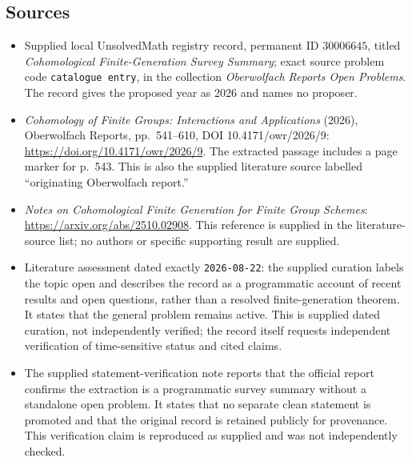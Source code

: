 \documentclass[11pt]{article}
\begin{document}
\subsection{Sources}
\begin{itemize}
\item Supplied local UnsolvedMath registry record, permanent ID \(30006645\), titled \emph{Cohomological Finite-Generation Survey Summary}; exact source problem code \texttt{catalogue entry}, in the collection \emph{Oberwolfach Reports Open Problems}. The record gives the proposed year as 2026 and names no proposer.
\item \emph{Cohomology of Finite Groups: Interactions and Applications} (2026), Oberwolfach Reports, pp.\ 541--610, DOI 10.4171/owr/2026/9: \url{https://doi.org/10.4171/owr/2026/9}. The extracted passage includes a page marker for p.\ 543. This is also the supplied literature source labelled ``originating Oberwolfach report.''
\item \emph{Notes on Cohomological Finite Generation for Finite Group Schemes}: \url{https://arxiv.org/abs/2510.02908}. This reference is supplied in the literature-source list; no authors or specific supporting result are supplied.
\item Literature assessment dated exactly \texttt{2026-08-22}: the supplied curation labels the topic open and describes the record as a programmatic account of recent results and open questions, rather than a resolved finite-generation theorem. It states that the general problem remains active. This is supplied dated curation, not independently verified; the record itself requests independent verification of time-sensitive status and cited claims.
\item The supplied statement-verification note reports that the official report confirms the extraction is a programmatic survey summary without a standalone open problem. It states that no separate clean statement is promoted and that the original record is retained publicly for provenance. This verification claim is reproduced as supplied and was not independently checked.
\end{itemize}
\end{document}
